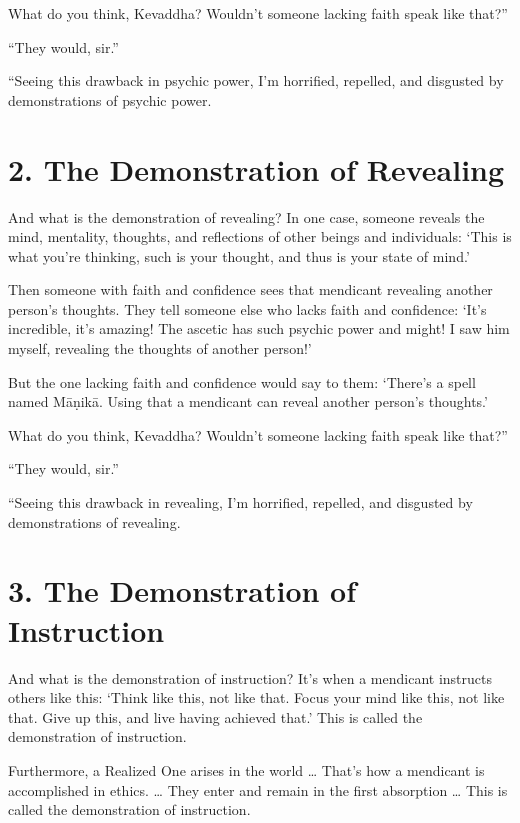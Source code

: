\documentclass[12pt,openany]{book}%
\begin{document}
What do you think, Kevaddha? Wouldn’t someone lacking faith speak like that?” 

“They would, sir.” 

“Seeing this drawback in psychic power, I’m horrified, repelled, and disgusted by demonstrations of psychic power. 

\section*{2. The Demonstration of Revealing }

And what is the demonstration of revealing? In one case, someone reveals the mind, mentality, thoughts, and reflections of other beings and individuals: ‘This is what you’re thinking, such is your thought, and thus is your state of mind.’ 

Then someone with faith and confidence sees that mendicant revealing another person’s thoughts. They tell someone else who lacks faith and confidence: ‘It’s incredible, it’s amazing! The ascetic has such psychic power and might! I saw him myself, revealing the thoughts of another person!’ 

But the one lacking faith and confidence would say to them: ‘There’s a spell named \textsanskrit{Māṇikā}. Using that a mendicant can reveal another person’s thoughts.’ 

What do you think, Kevaddha? Wouldn’t someone lacking faith speak like that?” 

“They would, sir.” 

“Seeing this drawback in revealing, I’m horrified, repelled, and disgusted by demonstrations of revealing. 

\section*{3. The Demonstration of Instruction }

And what is the demonstration of instruction? It’s when a mendicant instructs others like this: ‘Think like this, not like that. Focus your mind like this, not like that. Give up this, and live having achieved that.’ This is called the demonstration of instruction. 

Furthermore, a Realized One arises in the world … That’s how a mendicant is accomplished in ethics. … They enter and remain in the first absorption … This is called the demonstration of instruction. 
\end{document}

